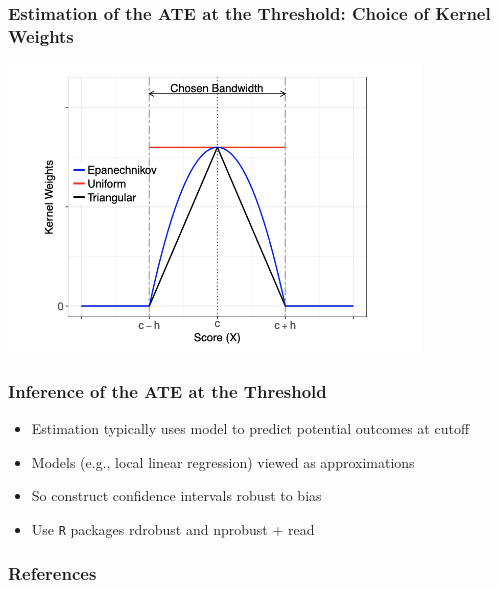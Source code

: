 \documentclass[table, xcolor = {dvipsnames}, 9pt]{beamer}
\theoremstyle{plain}
\begin{document}
\begin{frame}
\frametitle{Estimation of the ATE at the Threshold: Choice of Kernel Weights}
\begin{center}
\includegraphics[height=3in, keepaspectratio=1]{figures/kernel.png}
\end{center}
\end{frame}
\begin{frame}
\frametitle{Inference of the ATE at the Threshold}
\vfill
\begin{itemize} \vfill
\item Estimation typically uses model to predict potential outcomes at cutoff \vfill
\item Models (e.g., local linear regression) viewed as approximations \vfill
\item So construct confidence intervals robust to bias \citep[see][]{calonicoetal2014} \vfill
\item Use \texttt{R} packages \textrm{rdrobust} and \textrm{nprobust} + read \citet{calonicoetal2019} \vfill
\end{itemize} \vfill
\end{frame}
\begin{frame}[allowframebreaks]
\frametitle{References} 
\scriptsize

\end{frame}
\end{document}
